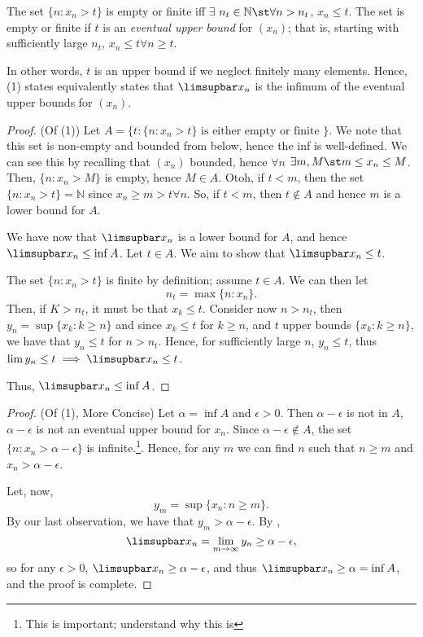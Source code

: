 \documentclass[12pt]{article}
\begin{document}
\begin{remark}
  The set $\{n : x_n > t\}$ is empty or finite iff $\exists$ $n_t \in \mathbb{N} \st \forall n > n_t$, $x_n \leq t$. The set is empty or finite if $t$ is an \emph{eventual upper bound} for $(x_n)$; that is, starting with sufficiently large $n_t$, $x_n \leq t \forall n \geq t$.

  In other words, $t$ is an upper bound if we neglect finitely many elements. Hence, (1) states equivalently states that $\limsupbar x_n$ is the infimum of the eventual upper bounds for $(x_n)$. 
\end{remark}

\begin{proof}(Of (1)) Let $A = \{t : \{n : x_n > t\} \text{ is either empty or finite }\}$. We note that this set is non-empty and bounded from below, hence the inf is well-defined. We can see this by recalling that $(x_n)$ bounded, hence $\forall n$ $\exists m, M \st m \leq x_n \leq M$. Then, $\{n : x_n > M\}$ is empty, hence $M \in A$. Otoh, if $t < m$, then the set $\{n : x_n > t\} = \mathbb{N}$ since $x_n \geq m > t \forall n$. So, if $t < m$, then $t \notin A$ and hence $m$ is a lower bound for $A$. 

We have now that $\limsupbar x_n$ is a lower bound for $A$, and hence $\limsupbar x_n \leq \inf A$. Let $t \in A$. We aim to show that $\limsupbar x_n \leq t$.

The set $\{n : x_n > t\}$ is finite by definition; assume $t \in A$. We can then let \[
  n_t = \max \{n : x_n\}.  
\]
Then, if $K > n_t$, it must be that $x_k \leq t$. Consider now $n > n_t$, then $y_n = \sup \{ x_k : k \geq n\}$ and since $x_k \leq t$ for $k \geq n$, and $t$ upper bounds $\{x_k: k \geq n\}$, we have that $y_n \leq t$ for $n > n_t$. Hence, for sufficiently large $n$, $y_n \leq t$, thus $\lim y_n \leq t \implies \limsupbar x_n \leq t$. 

Thus, $\limsupbar x_n \leq \inf A$.
\end{proof}

\begin{proof}(Of (1), More Concise)
  Let $\alpha = \inf A$ and $\epsilon > 0$. Then $\alpha - \epsilon$ is not in $A$, $\alpha - \epsilon$ is not an eventual upper bound for $x_n$. Since $\alpha - \epsilon \not\in A$, the set $\{n : x_n > \alpha - \epsilon\}$ is infinite.\footnote{This is important; understand why this is}. Hence, for any $m$ we can find $n$ such that $n \geq m$ and $x_n > \alpha - \epsilon$.

  Let, now, $$y_m = \sup \{x_n : n \geq m\}.$$ By our last observation, we have that $y_m > \alpha - \epsilon$. By , \[
  \limsupbar x_n = \lim_{m\to\infty} y_n \geq \alpha - \epsilon,
  \]
  so for any $\epsilon > 0$, $\limsupbar x_n \geq \alpha - \epsilon$, and thus $\limsupbar x_n \geq \alpha = \inf A$, and the proof is complete.
\end{proof}
\end{document}
